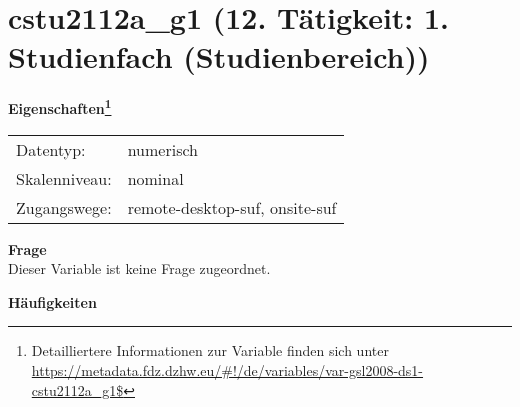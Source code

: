 
    \setcounter{footnote}{0}

    \vspace*{-1.8cm}
	\section{cstu2112a\_g1 (12. Tätigkeit: 1. Studienfach (Studienbereich))}
	\label{section:cstu2112a_g1}



    \vspace*{0.5cm}
    \noindent\textbf{Eigenschaften\footnote{Detailliertere Informationen zur Variable finden sich unter
		\url{https://metadata.fdz.dzhw.eu/\#!/de/variables/var-gsl2008-ds1-cstu2112a_g1$}}}\\
	\begin{tabularx}{\hsize}{@{}lX}
	Datentyp: & numerisch \\
	Skalenniveau: & nominal \\
	Zugangswege: &
	  remote-desktop-suf, 
	  onsite-suf
 \\
    \end{tabularx}



		\vspace*{0.5cm}
		\noindent\textbf{Frage}\\
		Dieser Variable ist keine Frage zugeordnet.





        		\vspace*{0.5cm}
                \noindent\textbf{Häufigkeiten}

